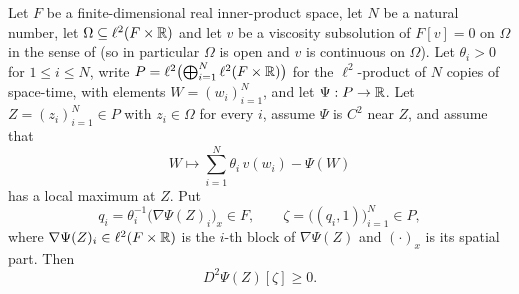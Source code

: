 \begin{lemma}
Let $F$ be a finite-dimensional real inner-product space, let $N$ be a natural
number, let $\Omega\subseteq\ell^2(F\times\mathbb{R})$ and let $v$ be a viscosity
subsolution of $F[v]=0$ on $\Omega$ in the sense of  (so
in particular $\Omega$ is open and $v$ is continuous on $\Omega$). Let
$\theta_i>0$ for $1\le i\le N$, write
$P=\ell^2\bigl(\bigoplus_{i=1}^N\ell^2(F\times\mathbb{R})\bigr)$ for the $\ell^2$-product
of $N$ copies of space-time, with elements $W=(w_i)_{i=1}^N$, and let
$\Psi:P\to\mathbb{R}$. Let $Z=(z_i)_{i=1}^N\in P$ with $z_i\in\Omega$ for every $i$,
assume $\Psi$ is $C^2$ near $Z$, and assume that
\[
  W\longmapsto\sum_{i=1}^N\theta_i\,v(w_i)-\Psi(W)
\]
has a local maximum at $Z$. Put
\[
  q_i=\theta_i^{-1}\bigl(\nabla\Psi(Z)_i\bigr)_x\in F,
  \qquad
  \zeta=\bigl((q_i,1)\bigr)_{i=1}^N\in P,
\]
where $\nabla\Psi(Z)_i\in\ell^2(F\times\mathbb{R})$ is the $i$-th block of
$\nabla\Psi(Z)$ and $(\cdot)_x$ is its spatial part. Then
\[
  D^2\Psi(Z)[\zeta]\ge0 .
\]
\end{lemma}
